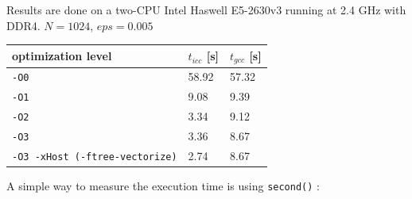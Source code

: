 \documentclass[11pt,a4paper]{article}
\begin{document}
\begin{exercise} 

Results are done on a two-CPU Intel Haswell E5-2630v3 running at 2.4 GHz with DDR4. $N=1024$, $eps=0.005$

\begin{center}
   \begin{tabular}{|l||l|l|}
     \hline
     optimization level & $t_{icc}$ [s] & $t_{gcc}$ [s] \\ \hline \hline
     {\tt -O0} & 58.92 & 57.32 \\ \hline
     {\tt -O1} & 9.08 & 9.39 \\ \hline
     {\tt -O2} & 3.34 & 9.12 \\ \hline
     {\tt -O3} & 3.36 & 8.67 \\ \hline
     {\tt -O3 -xHost (-ftree-vectorize)} & 2.74 & 8.67 \\
     \hline
   \end{tabular}
 \end{center}

A simple way to measure the execution time is using {\tt second()} :

\end{exercise}


\end{document}
